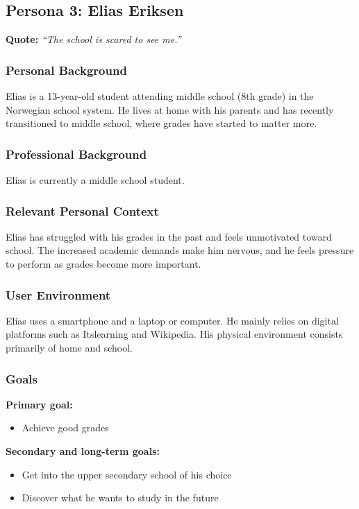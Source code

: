 
\subsection{Persona 3: Elias Eriksen}

\textbf{Quote:}  
\emph{“The school is scared to see me.”}

\subsubsection{Personal Background}
Elias is a 13-year-old student attending middle school (8th grade) in the Norwegian school system. He lives at home with his parents and has recently transitioned to middle school, where grades have started to matter more.

\subsubsection{Professional Background}
Elias is currently a middle school student.

\subsubsection{Relevant Personal Context}
Elias has struggled with his grades in the past and feels unmotivated toward school. The increased academic demands make him nervous, and he feels pressure to perform as grades become more important.

\subsubsection{User Environment}
Elias uses a smartphone and a laptop or computer. He mainly relies on digital platforms such as Itslearning and Wikipedia. His physical environment consists primarily of home and school.

\subsubsection{Goals}
\textbf{Primary goal:}
\begin{itemize}
    \item Achieve good grades
\end{itemize}

\textbf{Secondary and long-term goals:}
\begin{itemize}
    \item Get into the upper secondary school of his choice
    \item Discover what he wants to study in the future
\end{itemize}

